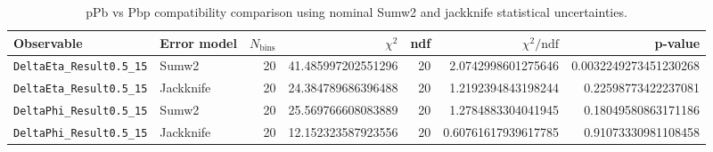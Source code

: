 \begin{table}[htbp]
\centering
\begin{tabular}{|l|l|r|r|r|r|r|}
\hline
Observable & Error model & $N_{\mathrm{bins}}$ & $\chi^2$ & ndf & $\chi^2/\mathrm{ndf}$ & p-value \\
\hline
\texttt{DeltaEta_Result0.5_15} & Sumw2 & 20 & 41.485997202551296 & 20 & 2.0742998601275646 & 0.0032249273451230268 \\
\texttt{DeltaEta_Result0.5_15} & Jackknife & 20 & 24.384789686396488 & 20 & 1.2192394843198244 & 0.22598773422237081 \\
\texttt{DeltaPhi_Result0.5_15} & Sumw2 & 20 & 25.569766608083889 & 20 & 1.2784883304041945 & 0.18049580863171186 \\
\texttt{DeltaPhi_Result0.5_15} & Jackknife & 20 & 12.152323587923556 & 20 & 0.60761617939617785 & 0.91073330981108458 \\
\hline
\end{tabular}
\caption{pPb vs Pbp compatibility comparison using nominal Sumw2 and jackknife statistical uncertainties.}
\label{tab:ppbp-sumw2-vs-jackknife-compatibility}
\end{table}
